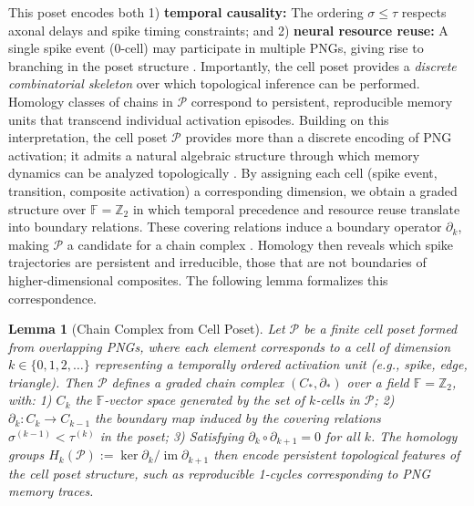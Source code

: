 \documentclass[lettersize,journal]{IEEEtran}
\newtheorem{lemma}{Lemma}
\begin{document}
This poset encodes both 1) \textbf{temporal causality:} The ordering \( \sigma \leq \tau \) respects axonal delays and spike timing constraints;
and 2) \textbf{neural resource reuse:} A single spike event (0-cell) may participate in multiple PNGs, giving rise to branching in the poset structure \cite{wachs2006poset}.
Importantly, the cell poset provides a \emph{discrete combinatorial skeleton} over which topological inference can be performed. Homology classes of chains in \( \mathcal{P} \) correspond to persistent, reproducible memory units that transcend individual activation episodes. Building on this interpretation, the cell poset \( \mathcal{P} \) provides more than a discrete encoding of PNG activation; it admits a natural algebraic structure through which memory dynamics can be analyzed topologically \cite{miller2020homological}. By assigning each cell (spike event, transition, composite activation) a corresponding dimension, we obtain a graded structure over \( \mathbb{F}=\mathbb{Z}_2 \) in which temporal precedence and resource reuse translate into boundary relations. These covering relations induce a boundary operator \( \partial_k \), making \( \mathcal{P} \) a candidate for a chain complex \cite{ayzenberg2025sheaf}. Homology then reveals which spike trajectories are persistent and irreducible, those that are not boundaries of higher-dimensional composites. The following lemma formalizes this correspondence.


\begin{lemma}[Chain Complex from Cell Poset]
Let \( \mathcal{P} \) be a finite cell poset formed from overlapping PNGs, where each element corresponds to a cell of dimension \( k \in \{0,1,2,\dots\} \) representing a temporally ordered activation unit (e.g., spike, edge, triangle). Then \( \mathcal{P} \) defines a graded chain complex \( (C_*, \partial_*) \) over a field \( \mathbb{F}=\mathbb{Z}_2  \), with:
1) \( C_k \) the \( \mathbb{F} \)-vector space generated by the set of \( k \)-cells in \( \mathcal{P} \);
2) \( \partial_k: C_k \to C_{k-1} \) the boundary map induced by the covering relations \( \sigma^{(k-1)} < \tau^{(k)} \) in the poset;
3) Satisfying \( \partial_k \circ \partial_{k+1} = 0 \) for all \( k \).
The homology groups \( H_k(\mathcal{P}) := \ker \partial_k / \operatorname{im} \partial_{k+1} \) then encode persistent topological features of the cell poset structure, such as reproducible 1-cycles corresponding to PNG memory traces.
\label{lemma:chain_complex_cell_poset}
\end{lemma}
\end{document}
